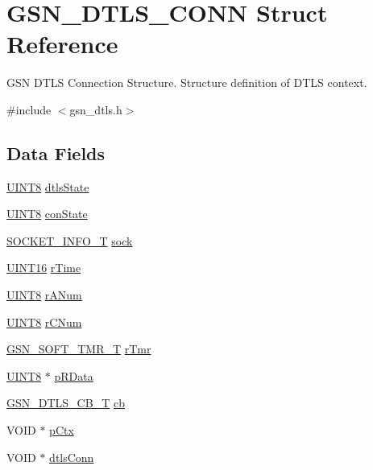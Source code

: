 \hypertarget{a00057}{
\section{GSN\_\-DTLS\_\-CONN Struct Reference}
\label{a00057}
}


GSN DTLS Connection Structure. Structure definition of DTLS context.  




{\ttfamily \#include $<$gsn\_\-dtls.h$>$}

\subsection*{Data Fields}
\begin{DoxyCompactItemize}
\item 
\hyperlink{a00660_gab27e9918b538ce9d8ca692479b375b6a}{UINT8} \hyperlink{a00057_a591bc617ecbe65923ee7d8b7ce93ab9a}{dtlsState}
\item 
\hyperlink{a00660_gab27e9918b538ce9d8ca692479b375b6a}{UINT8} \hyperlink{a00057_a3c2c5d096f2f91987003abb0570f3b1c}{conState}
\item 
\hyperlink{a00460}{SOCKET\_\-INFO\_\-T} \hyperlink{a00057_aba934750a9022e667e0fa36720a8ff26}{sock}
\item 
\hyperlink{a00660_ga09f1a1fb2293e33483cc8d44aefb1eb1}{UINT16} \hyperlink{a00057_aaf93463b79d7a5e2afa4a3849a564ba2}{rTime}
\item 
\hyperlink{a00660_gab27e9918b538ce9d8ca692479b375b6a}{UINT8} \hyperlink{a00057_ace74cf4b0ebbc99afe9207fcb1c237fd}{rANum}
\item 
\hyperlink{a00660_gab27e9918b538ce9d8ca692479b375b6a}{UINT8} \hyperlink{a00057_a87b9de102825c773d263144bff4217b8}{rCNum}
\item 
\hyperlink{a00229}{GSN\_\-SOFT\_\-TMR\_\-T} \hyperlink{a00057_ad1e735b99973e01e9258bf0e63853eef}{rTmr}
\item 
\hyperlink{a00660_gab27e9918b538ce9d8ca692479b375b6a}{UINT8} $\ast$ \hyperlink{a00057_a4eb76fd4760396cfaabc5add2dade131}{pRData}
\item 
\hyperlink{a00487_a5d2b26f5083cf0fda1a5356fe26ad9c3}{GSN\_\-DTLS\_\-CB\_\-T} \hyperlink{a00057_a027e6443bb2199b98001953fdd15eff2}{cb}
\item 
VOID $\ast$ \hyperlink{a00057_a5ef049defd7cc5565bb3c81588802ef7}{pCtx}
\item 
VOID $\ast$ \hyperlink{a00057_aaf4ac5ae4dc1f65b994105ff581f4b2a}{dtlsConn}
\end{DoxyCompactItemize}


